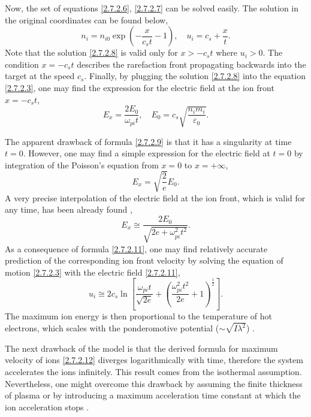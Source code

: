 Now, the set of equations \ref{2.7.2.6}, \ref{2.7.2.7} can be solved easily. The solution in the original coordinates can be found below,
\begin{equation}
\label{2.7.2.8}
n_i = n_{i0} \exp \left( -\frac{x}{c_s t} - 1 \right), \quad u_i = c_s + \frac{x}{t}.
\end{equation}
Note that the solution \ref{2.7.2.8} is valid only for $ x > -c_s t $ where $ u_i > 0 $. The condition $ x = - c_s t $ describes the rarefaction front propagating backwards into the target at the speed $ c_s $. Finally, by plugging the solution \ref{2.7.2.8} into the equation \ref{2.7.2.3}, one may find the expression for the electric field at the ion front $ x = - c_s t $,
\begin{equation}
\label{2.7.2.9}
E_x = \frac{2 E_0}{\omega_{pi} t}, \quad E_0 = c_s \sqrt{\frac{n_i m_i}{\varepsilon_0}}.
\end{equation}

The apparent drawback of formula \ref{2.7.2.9} is that it has a singularity at time $ t = 0 $. However, one may find a simple expression for the electric field at $ t = 0 $ by integration of the Poisson's equation from $ x = 0 $ to $ x = +\infty $,
\begin{equation}
\label{2.7.2.10}
E_x = \sqrt{\frac{2}{e}} E_0.
\end{equation}
A very precise interpolation of the electric field at the ion front, which is valid for any time, has been already found \cite{Lifschitz2014},
\begin{equation}
\label{2.7.2.11}
E_x \cong \frac{2 E_0}{\sqrt{2e + \omega_{pi}^2 t^2}}.
\end{equation}
As a consequence of formula \ref{2.7.2.11}, one may find relatively accurate prediction of the corresponding ion front velocity by solving the equation of motion \ref{2.7.2.3} with the electric field \ref{2.7.2.11},
\begin{equation}
\label{2.7.2.12}
u_i \cong 2 c_s \ln \left[ \frac{\omega_{pi} t}{\sqrt{2 e}} + \left(\frac{\omega_{pi}^2 t^2}{2 e} + 1 \right)^{\frac{1}{2}} \right].
\end{equation}
The maximum ion energy is then proportional to the temperature of hot electrons, which scales with the ponderomotive potential ($ \sim \sqrt{I \lambda^2} $) \cite{Wilks1992, Zeil2010, Fuchs2006}.

The next drawback of the model is that the derived formula for maximum velocity of ions \ref{2.7.2.12} diverges logarithmically with time, therefore the system accelerates the ions infinitely. This result comes from the isothermal assumption. Nevertheless, one might overcome this drawback by assuming the finite thickness of plasma or by introducing a maximum acceleration time constant at which the ion acceleration stops \cite{Fourmaux2013}.